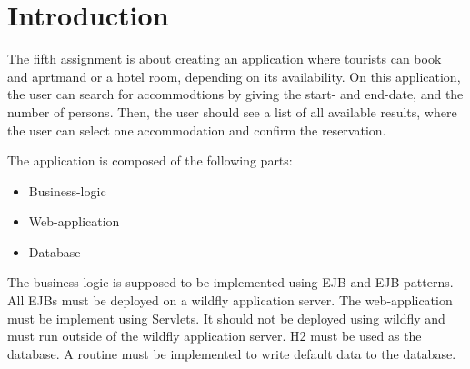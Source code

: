 \section{Introduction}\label{sec:01_intro}
The fifth assignment is about creating an application where tourists can book and aprtmand or a hotel room, depending on its availability.
On this application, the user can search for accommodtions by giving the start- and end-date, and the number of persons. Then, the user should see a list of all available results, where the user can select one accommodation and confirm the reservation.


The application is composed of the following parts:
\begin{itemize}
\item Business-logic
\item Web-application
\item Database
\end{itemize}

The business-logic is supposed to be implemented using EJB and EJB-patterns. All EJBs must be deployed on a wildfly application server.
The web-application must be implement using Servlets. It should not be deployed using wildfly and must run outside of the wildfly application server.
H2 must be used as the database. A routine must be implemented to write default data to the database.
